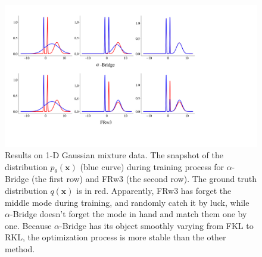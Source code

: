 \documentclass[letterpaper]{article} %
\newcommand{\xv}[0]{\ensuremath{\boldsymbol{x}} }
\begin{document}
\begin{figure}[H]
	\begin{center}
		\includegraphics[width=0.8\columnwidth]{Figures/vs_FKLpRKL_3c.pdf}
		\caption{\small 
			Results on 1-D Gaussian mixture data. The snapshot of the distribution $p_{\theta}(\xv)$ (blue curve) during training process for $\alpha$-Bridge (the first row) and FRw3 (the second row). The ground truth distribution $q(\xv)$ is in red. Apparently, FRw3 has forget the middle mode during training, and randomly catch it by luck, while $\alpha$-Bridge doesn't forget the mode in hand and match them one by one. Because $\alpha$-Bridge has its object smoothly varying from FKL to RKL, the optimization process is more stable than the other method. 
		}
		\label{fig:vs_FKLpRKL_3c}
	\end{center}
\end{figure}





%		
\end{document}
